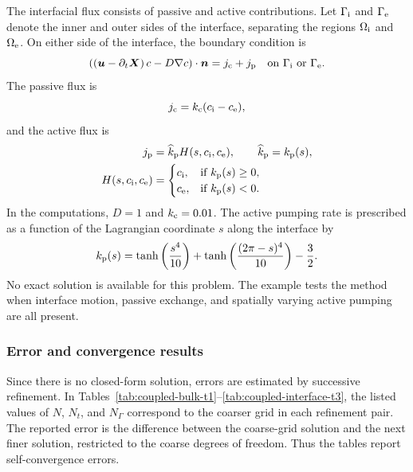 \documentclass[11pt,reqno]{amsart}
\theoremstyle{plain}
\theoremstyle{definition}
\numberwithin{equation}{section}
\newcommand{\paren}[1]{\left(#1\right)}
\newcommand{\p}{\partial}
\newcommand{\grad}[1]{\nabla #1}
\newcommand{\bm}[1]{\boldsymbol{#1}}
\begin{document}
The interfacial flux consists of passive and active contributions. Let
$\Gamma_{\rm i}$ and $\Gamma_{\rm e}$ denote the inner and outer sides of the
interface, separating the regions $\Omega_{\rm i}$ and $\Omega_{\rm e}$. On
either side of the interface, the boundary condition is
\begin{equation}
\paren{\paren{\bm u-\p_t\bm X}c-D\grad c}\cdot \bm n
=j_{\rm c}+j_{\rm p}
\quad\text{on } \Gamma_{\rm i}\text{ or }\Gamma_{\rm e}.
\label{ckbc}
\end{equation}
The passive flux is
\begin{equation}\label{jcexp}
j_{\rm c}=k_{\rm c}(c_{\rm i}-c_{\rm e}),
\end{equation}
and the active flux is
\begin{equation}\label{jpexp}
\begin{split}
j_{\rm p}&=\widehat{k}_{\rm p}H(s, c_{\rm i}, c_{\rm e}), \qquad
\widehat{k}_{\rm p}=k_{\rm p}(s),\\
H(s,c_{\rm i}, c_{\rm e})&=
\begin{cases}
c_{\rm i}, &\text{if } k_{\rm p}(s)\geq 0,\\
c_{\rm e}, &\text{if } k_{\rm p}(s)<0.
\end{cases}
\end{split}
\end{equation}
In the computations, $D=1$ and $k_{\rm c}=0.01$. The active
pumping rate is prescribed as a function of the Lagrangian coordinate $s$
along the interface by
\begin{equation}
k_{\rm p}(s)=
\tanh\left(\frac{s^4}{10}\right)
+\tanh\left(\frac{(2\pi-s)^4}{10}\right)
-\frac{3}{2}.
\end{equation}
No exact solution is available for this problem. The example tests the method
when interface motion, passive exchange, and spatially varying active pumping
are all present.

\subsubsection{Error and convergence results}
Since there is no closed-form solution, errors are estimated by successive
refinement. In Tables~\ref{tab:coupled-bulk-t1}--\ref{tab:coupled-interface-t3},
the listed values of $N$, $N_t$, and $N_\Gamma$ correspond to the coarser grid
in each refinement pair. The reported error is the difference between the
coarse-grid solution and the next finer solution, restricted to the coarse
degrees of freedom. Thus the tables report self-convergence errors.
\end{document}
